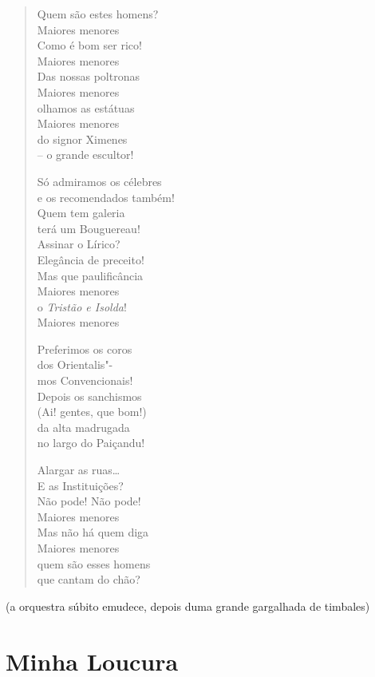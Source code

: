 \begin{verse}
Quem são estes homens?\\
Maiores menores\\
Como é bom ser rico!\\
Maiores menores\\
Das nossas poltronas\\
Maiores menores\\
olhamos as estátuas\\
Maiores menores\\
do signor Ximenes\\
-- o grande escultor!

Só admiramos os célebres\\
e os recomendados também!\\
Quem tem galeria\\
terá um Bouguereau!\\
Assinar o Lírico?\\
Elegância de preceito!\\
Mas que paulificância\\
Maiores menores\\
o \emph{Tristão e Isolda}!\\
Maiores menores

Preferimos os coros\\
dos Orientalis"-\\
mos Convencionais!\\
Depois os sanchismos\\
(Ai! gentes, que bom!)\\
da alta madrugada\\
no largo do Paiçandu!

Alargar as ruas\ldots{}\\
E as Instituições?\\
Não pode! Não pode!\\
Maiores menores\\
Mas não há quem diga\\
Maiores menores\\
quem são esses homens\\
que cantam do chão?
\end{verse}

\hfill{}{\small(a orquestra súbito emudece, depois duma grande gargalhada de timbales)}

\medskip
\section*{Minha Loucura}

